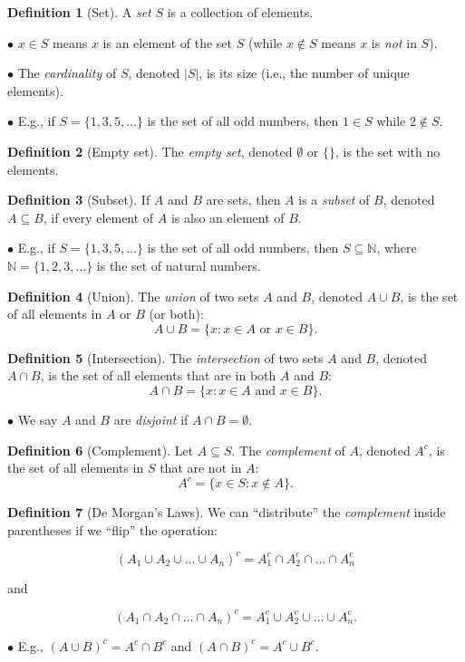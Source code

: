 \documentclass[12pt,oneside]{article}
\theoremstyle{definition}
\newtheorem{definition}{Definition}
\theoremstyle{remark}
\begin{document}
\begin{definition}[Set]
A \textit{set} $S$ is a collection of elements.

$\bullet$ $x \in S$ means $x$ is an element of the set $S$ (while $x \notin S$ means $x$ is \textit{not} in $S$).

$\bullet$ The \textit{cardinality} of $S$, denoted $|S|$, is its size (i.e., the number of unique elements).

$\bullet$ E.g., if $S = \{1, 3, 5, \ldots\}$ is the set of all odd numbers, then $1 \in S$ while $2 \notin S$.
\end{definition}

\begin{definition}[Empty set]
The \textit{empty set}, denoted $\emptyset$ or $\{\}$, is the set with no elements.
\end{definition}

\begin{definition}[Subset]
If $A$ and $B$ are sets, then $A$ is a \textit{subset} of $B$, denoted $A \subseteq B$, if every element of $A$ is also an element of $B$.

$\bullet$ E.g., if $S = \{1, 3, 5, \ldots\}$ is the set of all odd numbers, then $S \subseteq \mathbb{N}$, where $\mathbb{N} = \{1, 2, 3, \ldots\}$ is the set of natural numbers.
\end{definition}

\begin{definition}[Union]
The \textit{union} of two sets $A$ and $B$, denoted $A \cup B$, is the set of all elements in $A$ or $B$ (or both): \[A \cup B = \{x : x \in A \text{ or } x \in B\}.\]
\end{definition}

\begin{definition}[Intersection]
The \textit{intersection} of two sets $A$ and $B$, denoted $A \cap B$, is the set of all elements that are in both $A$ and $B$: \[A \cap B = \{x : x \in A \text{ and } x \in B\}.\]

$\bullet$ We say $A$ and $B$ are \textit{disjoint} if $A \cap B = \emptyset$.
\end{definition}

\begin{definition}[Complement]
Let $A \subseteq S$. The \textit{complement} of $A$, denoted $A^c$, is the set of all elements in $S$ that are not in $A$: \[A^c = \{x \in S: x \notin A\}.\]
\end{definition}

\begin{definition}[De Morgan's Laws]
We can \enquote{distribute} the \textit{complement} inside parentheses if we \enquote{flip} the operation:

\[(A_1 \cup A_2 \cup \ldots \cup A_n)^c = A_1^c \cap A_2^c \cap \ldots \cap A_n^c\] 

and

\[(A_1 \cap A_2 \cap \ldots \cap A_n)^c = A_1^c \cup A_2^c \cup \ldots \cup A_n^c.\]

$\bullet$ E.g., $(A \cup B)^c = A^c \cap B^c$ and $(A \cap B)^c = A^c \cup B^c$.
\end{definition}
\end{document}
